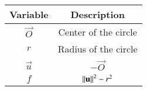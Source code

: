 \begin{tabular}[12pt]{ |c| c|}
    \hline
    \textbf{Variable} & \textbf{Description}\\ 
    \hline
	$\vec{O}$ & Center of the circle\\
    \hline
    $r$ & Radius of the circle\\
    \hline
    $\vec{u}$ & $-\vec{O}$\\
    \hline
    $f$ & $\left\lVert\mathbf{u}\right\rVert^2 - r^2$\\
    \hline
\end{tabular}